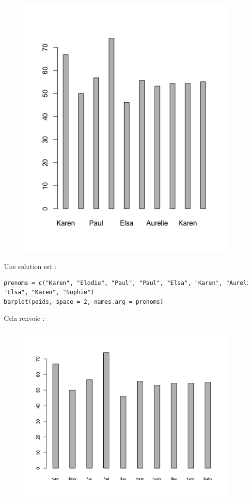 \begin{figure}[H]\begin{center}\includegraphics[scale=0.4]{ilu/gra38.png}\end{center}\end{figure}
Une solution est :
\begin{lstlisting}[language=html]
prenoms = c("Karen", "Elodie", "Paul", "Paul", "Elsa", "Karen", "Aurelie",
"Elsa", "Karen", "Sophie")
barplot(poids, space = 2, names.arg = prenoms)
\end{lstlisting}
Cela renvoie :
\begin{figure}[H]\begin{center}\includegraphics[scale=0.4]{ilu/gra39.png}\end{center}\end{figure}
